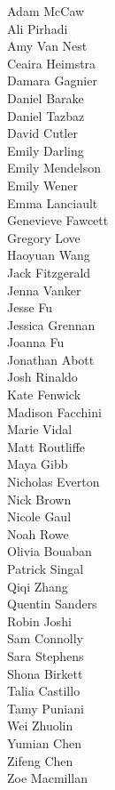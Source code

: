 \begin{multicols}{3}
\begin{center}
Adam McCaw\\
Ali Pirhadi\\
Amy Van Nest\\
Ceaira Heimstra\\
Damara Gagnier\\
Daniel Barake \\
Daniel Tazbaz\\
David Cutler\\
Emily Darling\\
Emily Mendelson\\
Emily Wener\\
Emma Lanciault\\
Genevieve Fawcett\\
Gregory Love\\
Haoyuan Wang\\
Jack Fitzgerald\\
Jenna Vanker\\
\columnbreak
Jesse Fu\\
Jessica Grennan\\
Joanna Fu\\
Jonathan Abott\\
Josh Rinaldo\\
Kate Fenwick\\
Madison Facchini\\
Marie Vidal\\
Matt Routliffe\\
Maya Gibb\\
Nicholas Everton\\
Nick Brown\\
Nicole Gaul\\
Noah Rowe\\
Olivia Bouaban\\
Patrick Singal\\
Qiqi Zhang\\
Quentin Sanders\\
\columnbreak
Robin Joshi\\
Sam Connolly\\
Sara Stephens\\
Shona Birkett\\
Talia Castillo\\
Tamy Puniani\\
Wei Zhuolin\\
Yumian Chen\\
Zifeng Chen\\
Zoe Macmillan
\end{center}
\end{multicols}

